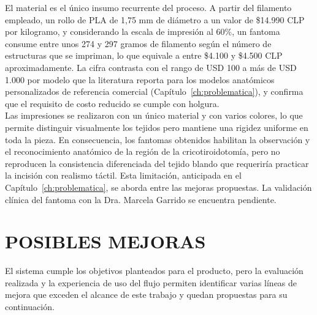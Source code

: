 El material es el único insumo recurrente del proceso. A partir del filamento empleado, un rollo de PLA de 1,75 mm de diámetro a un valor de \$14.990 CLP por kilogramo, y considerando la escala de impresión al 60\%, un fantoma consume entre unos 274 y 297 gramos de filamento según el número de estructuras que se impriman, lo que equivale a entre \$4.100 y \$4.500 CLP aproximadamente. La cifra contrasta con el rango de USD 100 a más de USD 1.000 por modelo que la literatura reporta para los modelos anatómicos personalizados de referencia comercial (Capítulo~\ref{ch:problematica}), y confirma que el requisito de costo reducido se cumple con holgura.\\

Las impresiones se realizaron con un único material y con varios colores, lo que permite distinguir visualmente los tejidos pero mantiene una rigidez uniforme en toda la pieza. En consecuencia, los fantomas obtenidos habilitan la observación y el reconocimiento anatómico de la región de la cricotiroidotomía, pero no reproducen la consistencia diferenciada del tejido blando que requeriría practicar la incisión con realismo táctil. Esta limitación, anticipada en el Capítulo~\ref{ch:problematica}, se aborda entre las mejoras propuestas. La validación clínica del fantoma con la Dra. Marcela Garrido se encuentra pendiente.\\

\section{POSIBLES MEJORAS}

El sistema cumple los objetivos planteados para el producto, pero la evaluación realizada y la experiencia de uso del flujo permiten identificar varias líneas de mejora que exceden el alcance de este trabajo y quedan propuestas para su continuación.\\

